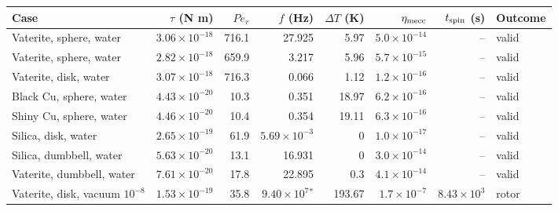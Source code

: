\begin{tabular}{@{}p{3.9cm}rrrrrrl@{}}
\hline
Case & $\tau$ (N m) & $Pe_r$ & $f$ (Hz) & $\Delta T$ (K) & $\eta_{\rm mecc}$ & $t_{\rm spin}$ (s) & Outcome \\
\hline
Vaterite, sphere, water & $3.06\times10^{-18}$ & 716.1 & 27.925 & 5.97 & $5.0\times10^{-14}$ & -- & valid \\
Vaterite, sphere, water & $2.82\times10^{-18}$ & 659.9 & 3.217 & 5.96 & $5.7\times10^{-15}$ & -- & valid \\
Vaterite, disk, water & $3.07\times10^{-18}$ & 716.3 & 0.066 & 1.12 & $1.2\times10^{-16}$ & -- & valid \\
Black Cu, sphere, water & $4.43\times10^{-20}$ & 10.3 & 0.351 & 18.97 & $6.2\times10^{-16}$ & -- & valid \\
Shiny Cu, sphere, water & $4.46\times10^{-20}$ & 10.4 & 0.354 & 19.11 & $6.3\times10^{-16}$ & -- & valid \\
Silica, disk, water & $2.65\times10^{-19}$ & 61.9 & $5.69\times10^{-3}$ & 0 & $1.0\times10^{-17}$ & -- & valid \\
Silica, dumbbell, water & $5.63\times10^{-20}$ & 13.1 & 16.931 & 0 & $3.0\times10^{-14}$ & -- & valid \\
Vaterite, dumbbell, water & $7.61\times10^{-20}$ & 17.8 & 22.895 & 0.3 & $4.1\times10^{-14}$ & -- & valid \\
Vaterite, disk, vacuum $10^{-8}$ & $1.53\times10^{-19}$ & 35.8 & $9.40\times10^{7}$$^\ast$ & 193.67 & $1.7\times10^{-7}$ & $8.43\times10^{3}$ & rotor \\
\hline
\end{tabular}

